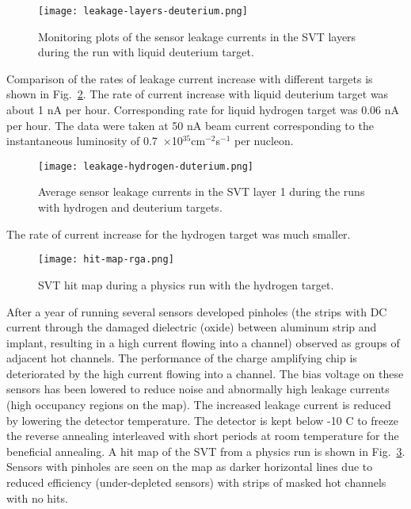 \begin{figure}[hbt] 
\centering 
\texttt{[image: leakage-layers-deuterium.png]}
\caption{Monitoring plots of the sensor leakage currents in the SVT layers during the run with liquid deuterium target.}
\label{fig:leakage-layers-deuterium}
\end{figure}

Comparison of the rates of leakage current increase with different targets is shown in Fig.~\ref{fig:leakage-hydrogen-duterium}. The rate of current increase with liquid deuterium target was about 1 nA per hour. Corresponding rate for liquid hydrogen target was 0.06 nA per hour. The data were taken at 50 nA beam current corresponding to the instantaneous luminosity of 0.7~$\times$10$^{35}$cm$^{-2}$s$^{-1}$ per nucleon.

\begin{figure}[hbt] 
\centering 
\texttt{[image: leakage-hydrogen-duterium.png]}
\caption{Average sensor leakage currents in the SVT layer 1 during the runs with hydrogen and deuterium targets.}
\label{fig:leakage-hydrogen-duterium}
\end{figure}

The rate of current increase for the hydrogen target was much smaller.
\begin{figure}[hbt] 
\centering 
\texttt{[image: hit-map-rga.png]}
\caption{SVT hit map during a physics run with the hydrogen target.}
\label{fig:hit-map-rga}
\end{figure}

After a year of running several sensors developed pinholes (the strips with DC current through the damaged dielectric (oxide) between aluminum strip and implant, resulting in a high current flowing into a channel) observed as groups of adjacent hot channels. The performance of the charge amplifying chip is deteriorated by the high current flowing into a channel. The bias voltage on these sensors has been lowered to reduce noise and abnormally high leakage currents (high occupancy regions on the map). The increased leakage current is reduced by lowering the detector temperature. The detector is kept below -10 C to freeze the reverse annealing interleaved with short periods at room temperature for the beneficial annealing. A hit map of the SVT from a physics run is shown in Fig.~\ref{fig:hit-map-rga}. Sensors with pinholes are seen on the map as darker horizontal lines due to reduced efficiency (under-depleted sensors) with strips of masked hot channels with no hits. 

